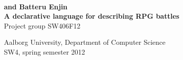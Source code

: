 \thispagestyle{empty}
{\begingroup
\raggedleft
\vspace*{\baselineskip}
{\color{nicered}\HUGE\bfseries \langname{} \\ \Huge and Batteru Enjin}\\[\baselineskip]
{\color{nicered}\large\bfseries A declarative language for describing RPG battles}\\[0.1\textheight]
{\color{nicered}\Large Project group SW406F12}\par
\vfill
{\Large \sffamily Aalborg University, Department of Computer Science\\
\hfill SW4, spring semester 2012}
\vspace*{\baselineskip}
\endgroup}


\begin{comment}
\begin{center}
	\hrulefill\newline
	\\
	\begin{LARGE}	
	\textbf{\langname{} and Batteru Enjin}
	\end{LARGE}
	\\
	\begin{large} 
	\textbf{A declarative language for describing RPG battles.}
	\end{large}\\
	\hrulefill\newline
	\\~\\
	Aalborg University, Fourth semester at Department of Computer Science \\
	SW4, spring semester 2012	\\
	Project group SW406F12\\
\end{center}
\end{comment}